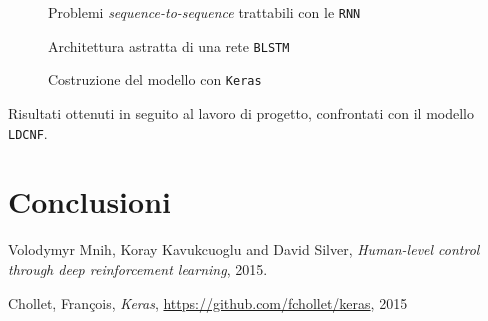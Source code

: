 \documentclass[twoside,twocolumn,10pt]{extarticle}
\theoremstyle{definition}
\begin{document}
	\begin{figure}[h]
		\centering
		\caption{Problemi \textit{sequence-to-sequence} trattabili con le \texttt{RNN}}
		\label{fig:seqs}
	\end{figure}
	\begin{figure}
		\centering
		\caption{Architettura astratta di una rete \texttt{BLSTM}}
		\label{fig:blstm}
	\end{figure}
	\begin{figure}[ht!]
		\centering
		\caption{Costruzione del modello con \texttt{Keras}}
		\label{fig:modelcode}
	\end{figure}
	\begin{table}[]
		\centering
		\caption{Risultati ottenuti in seguito al lavoro di progetto, confrontati con il modello \texttt{LDCNF}.}
		\label{tab:results}
		
	\end{table}
	
	\section{Conclusioni}	
	
\begin{thebibliography}{99}	
		Volodymyr Mnih, Koray Kavukcuoglu and David Silver,
		\newblock \emph{Human-level control through deep reinforcement learning},
		2015.
		
		Chollet, Fran\c{c}ois,
		\newblock \emph{Keras},
		\url{https://github.com/fchollet/keras},
		2015

\end{thebibliography}
\end{document}
